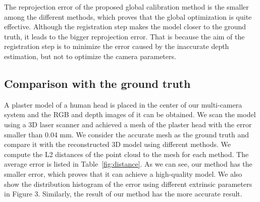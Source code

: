 The reprojection error of the proposed global calibration method is the smaller among the different methods, which proves that the global optimization is quite effective. Although the registration step makes the model closer to the ground truth, it leads to the bigger reprojection error. That is because the aim of the registration step is to minimize the error caused by the inaccurate depth estimation, but not to optimize the camera parameters.


\subsection{Comparison with the ground truth}



A plaster model of a human head is placed in the center of our multi-camera system and the RGB and depth images of it can be obtained. 
We scan the model using a 3D laser scanner and achieved a mesh of the plaster head with the error smaller than 0.04 mm. 
We consider the accurate mesh as the ground truth and compare it with the reconstructed 3D model using different methods. 
We compute the L2 distances of the point cloud to the mesh for each method.
%
The average error is listed in Table~\ref{fig:distance}. As we can see, our method has the smaller error, which proves that it can achieve a high-quality model.
We also show the distribution histogram of the error using different extrinsic parameters in Figure 3. 
Similarly, the result of our method has the more accurate result.

